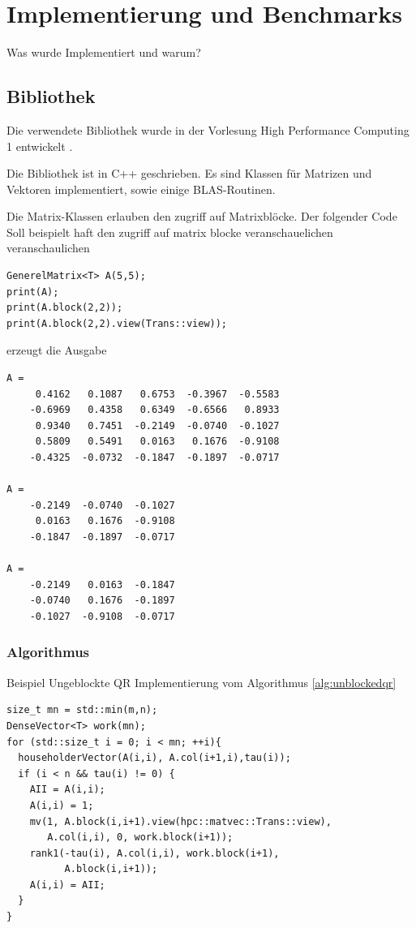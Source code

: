 \chapter{Implementierung und Benchmarks}
Was wurde Implementiert und warum?

\section{Bibliothek}
Die verwendete Bibliothek wurde in der Vorlesung High Performance Computing 1 entwickelt \cite{HPC1}.

Die Bibliothek ist in C++ geschrieben. Es sind Klassen für Matrizen und Vektoren implementiert, sowie einige BLAS-Routinen.

Die Matrix-Klassen erlauben den zugriff auf Matrixblöcke. 
Der folgender Code Soll beispielt haft den zugriff auf matrix blocke veranschauelichen veranschaulichen
\begin{lstlisting}
GenerelMatrix<T> A(5,5);
print(A);
print(A.block(2,2));
print(A.block(2,2).view(Trans::view));
\end{lstlisting}
erzeugt die Ausgabe
\lstset{numbers=none}
\begin{lstlisting} 
A = 
     0.4162   0.1087   0.6753  -0.3967  -0.5583
    -0.6969   0.4358   0.6349  -0.6566   0.8933
     0.9340   0.7451  -0.2149  -0.0740  -0.1027
     0.5809   0.5491   0.0163   0.1676  -0.9108
    -0.4325  -0.0732  -0.1847  -0.1897  -0.0717

A = 
    -0.2149  -0.0740  -0.1027
     0.0163   0.1676  -0.9108
    -0.1847  -0.1897  -0.0717

A = 
    -0.2149   0.0163  -0.1847
    -0.0740   0.1676  -0.1897
    -0.1027  -0.9108  -0.0717
\end{lstlisting}

\subsection{Algorithmus}

Beispiel Ungeblockte QR Implementierung vom Algorithmus \ref{alg:unblockedqr}
\lstset{numbers=left}
\begin{lstlisting}
size_t mn = std::min(m,n);
DenseVector<T> work(mn);
for (std::size_t i = 0; i < mn; ++i){
  householderVector(A(i,i), A.col(i+1,i),tau(i));
  if (i < n && tau(i) != 0) {
    AII = A(i,i);
    A(i,i) = 1;
    mv(1, A.block(i,i+1).view(hpc::matvec::Trans::view),
       A.col(i,i), 0, work.block(i+1));
    rank1(-tau(i), A.col(i,i), work.block(i+1), 
          A.block(i,i+1));
    A(i,i) = AII;
  }
}
\end{lstlisting}

